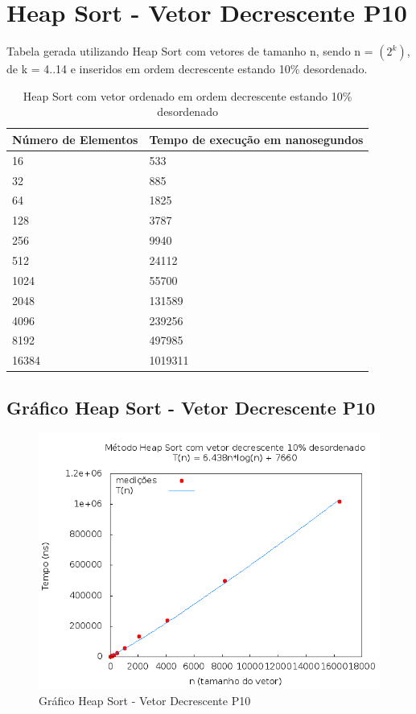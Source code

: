 \documentclass[12pt,a4paper,twoside]{report}
\begin{document}
\section{Heap Sort - Vetor Decrescente P10}
Tabela gerada utilizando Heap Sort com vetores de tamanho n, sendo n = $(2^k)$, de k = 4..14 e inseridos em ordem decrescente estando 10\% desordenado.
\begin{table}[H]
\centering
\caption{Heap Sort com vetor ordenado em ordem decrescente estando 10\% desordenado}
\label{my-label}
\begin{tabular}{|l|l|}
\hline
\multicolumn{1}{|c|}{\textbf{Número de Elementos}} & \multicolumn{1}{c|}{\textbf{Tempo de execução em nanosegundos}} \\ \hline
16 & 533 \\ \hline
32 & 885 \\ \hline
64 & 1825 \\ \hline
128 & 3787 \\ \hline
256 & 9940 \\ \hline
512 & 24112 \\ \hline
1024 & 55700 \\ \hline
2048 & 131589 \\ \hline
4096 & 239256 \\ \hline
8192 & 497985 \\ \hline
16384 & 1019311 \\ \hline
\end{tabular}
\end{table}

\subsection{Gráfico Heap Sort - Vetor Decrescente P10}
\begin{figure}[H]
    \centering
    \includegraphics[width=0.7\linewidth]{graficos/HeapSort/vIntDecrescenteP10/vIntDecrescenteP10.png}
  \caption{Gráfico Heap Sort - Vetor Decrescente P10}
\end{figure}
\end{document}
